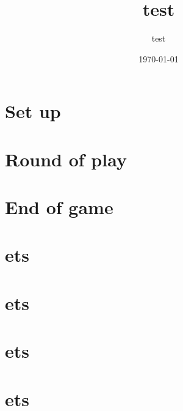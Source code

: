 \documentclass{article}%
\title{test}%
\author{test}%
\date{\today}%
\begin{document}
%
\normalsize%
\maketitle\thispagestyle{header}%
\pagestyle{header}%
\sectionfont{\color{blue}}%
\subsectionfont{\color{blue}}%
\subsubsectionfont{\color{blue}}%
\section{ Set up
}%
\label{sec:Setup}%

%
\sectionfont{\color{mygreen}}%
\subsectionfont{\color{mygreen}}%
\subsubsectionfont{\color{mygreen}}%
\section{ Round of play
}%
\label{sec:Roundofplay}%

%
\sectionfont{\color{red}}%
\subsectionfont{\color{red}}%
\subsubsectionfont{\color{red}}%
\section{ End of game
}%
\label{sec:Endofgame}%

%
\sectionfont{\color{cyan}}%
\subsectionfont{\color{cyan}}%
\subsubsectionfont{\color{cyan}}%
\section{ ets
}%
\label{sec:ets}%

%
\sectionfont{\color{orange}}%
\subsectionfont{\color{orange}}%
\subsubsectionfont{\color{orange}}%
\section{ ets
}%
\label{sec:ets}%

%
\sectionfont{\color{blue}}%
\subsectionfont{\color{blue}}%
\subsubsectionfont{\color{blue}}%
\section{ ets
}%
\label{sec:ets}%

%
\sectionfont{\color{mygreen}}%
\subsectionfont{\color{mygreen}}%
\subsubsectionfont{\color{mygreen}}%
\section{ ets
}%
\label{sec:ets}%

%
\sectionfont{\color{red}}%
\subsectionfont{\color{red}}%
\subsubsectionfont{\color{red}}%
\end{document}
